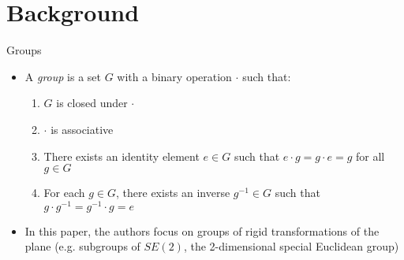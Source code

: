 \documentclass{beamer}
\begin{document}
\section{Background}
\begin{frame}{Groups}
    \begin{itemize}
        \item A \emph{group} is a set $G$ with a binary operation $\cdot$ such that:
        \begin{enumerate}
            \item $G$ is closed under $\cdot$
            \item $\cdot$ is associative
            \item There exists an identity element $e \in G$ such that $e \cdot g = g \cdot e = g$ for all $g \in G$
            \item For each $g \in G$, there exists an inverse $g^{-1} \in G$ such that $g \cdot g^{-1} = g^{-1} \cdot g = e$
        \end{enumerate}
        \item In this paper, the authors focus on groups of rigid transformations of the plane (e.g. subgroups of $SE(2)$, the 2-dimensional special Euclidean group)
    \end{itemize}
\end{frame}
\end{document}
